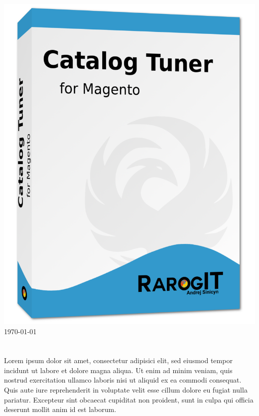 \documentclass[12pt]{report}
\begin{document}
\begin{titlepage}
\begin{center}
\includegraphics[width=1\textwidth]{../media/box/cataolg-tuner-box.png}\\
\today
\end{center}
\end{titlepage}
\tableofcontents
\chapter{
         }
Lorem ipsum dolor sit amet, consectetur adipisici elit, sed eiusmod tempor incidunt ut labore et dolore magna aliqua. Ut enim ad minim veniam, quis nostrud exercitation ullamco laboris nisi ut aliquid ex ea commodi consequat. Quis aute iure reprehenderit in voluptate velit esse cillum dolore eu fugiat nulla pariatur. Excepteur sint obcaecat cupiditat non proident, sunt in culpa qui officia deserunt mollit anim id est laborum.\\
\end{document}
